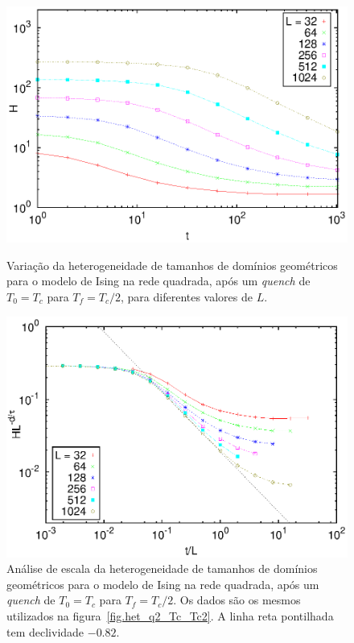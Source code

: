 \begin{figure}[p]
 \centering
 \includegraphics[width=14cm]{fig/het_q2_Tc_Tc2.eps}
 \caption{Variação da heterogeneidade de tamanhos de domínios geométricos para o modelo de Ising na rede quadrada, após um \textit{quench} de $T_0=T_c$ para $T_f=T_c/2$, para diferentes valores de $L$.}
\label{fig.het_q2_Tc_Tc2}
\vspace{8mm}
 \includegraphics[width=14cm]{fig/het_q2_Tc_Tc2_colXY.eps}
 \caption{Análise de escala da heterogeneidade de tamanhos de domínios geométricos para o modelo de Ising na rede quadrada, após um \textit{quench} de $T_0=T_c$ para $T_f=T_c/2$. Os dados são os mesmos utilizados na figura~\ref{fig.het_q2_Tc_Tc2}. A linha reta pontilhada tem declividade $-0.82$.}
\label{fig.het_q2_Tc_Tc2_colXY}
\end{figure}


